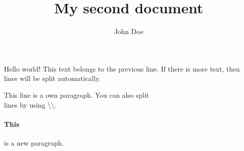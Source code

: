 \documentclass{article}
\title{My second document}
\author{John Doe}
\begin{document}
   \maketitle
   Hello world!
   This text belongs to the previous line.
   If there is more text, then lines will be split automatically.
   
   This line is a own paragraph.
   You can also split \\
   lines by using \textbackslash\textbackslash.
   
   \paragraph{This} is a new paragraph.
\end{document}
